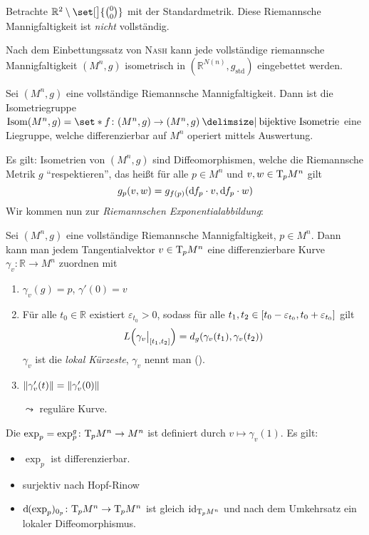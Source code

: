 \begin{beispiel*}
	Betrachte $\mathbb{R}^2 \setminus \set[\big]{\binom{0}{0}}$ mit der Standardmetrik. 
	Diese Riemannsche Mannigfaltigkeit ist \emph{nicht} vollständig.
\end{beispiel*}

\begin{bemerkung*}
	Nach dem Einbettungssatz von \textsc{Nash} kann jede vollständige riemannsche Mannigfaltigkeit $(M^n,g)$ isometrisch in $(\mathbb{R}^{N(n)},g_{\mathrm{std}})$ eingebettet werden.
\end{bemerkung*}

\begin{satz}[{name={Myers-Steenrod}}]
	Sei $(M^n,g)$ eine vollständige Riemannsche Mannigfaltigkeit.
	Dann ist die Isometriegruppe $\Isom(M^n,g) = \set*{f \colon (M^n,g) \to (M^n,g) \given \text{bijektive Isometrie} }$ eine Liegruppe, welche differenzierbar auf $M^n$ operiert mittels Auswertung.
\end{satz}

Es gilt: Isometrien von $(M^n,g)$ sind Diffeomorphismen, welche die Riemannsche Metrik $g$ \enquote{respektieren}, das heißt für alle $p \in M^n$ und $v,w \in \Tmap_p M^n$ gilt
\[
	g_p(v,w) = g_{f(p)} \enbrace*{\mathd f_p \cdot v , \mathd f_p \cdot w}
\]
Wir kommen nun zur \emph{Riemannschen Exponentialabbildung}: 

Sei $(M^n,g)$ eine vollständige Riemannsche Mannigfaltigkeit, $p \in M^n$.
Dann kann man jedem Tangentialvektor $v \in \Tmap_p M^n$ eine differenzierbare Kurve $\gamma_v \colon \mathbb{R} \to M^n$ zuordnen mit
\begin{enumerate}[1)]
	\item $\gamma_v(g)=p$, $\gamma'(0)=v$
	\item Für alle $t_0 \in \mathbb{R}$ existiert $\varepsilon_{t_0} >0$, sodass für alle $t_1,t_2 \in \benbrace*{t_0 - \varepsilon_{t_0}, t_0 + \varepsilon_{t_0}}$ gilt
	\[
		L \enbrace*{\gamma_v\big|_{\benbrace*{t_1,t_2}}} = d_g \enbrace*{\gamma_v(t_1), \gamma_v(t_2)}
	\]
	$\gamma_v$ ist die \emph{lokal Kürzeste}, $\gamma_v$ nennt man  ().
	\item $\norm*{\gamma_v'(t)} = \norm*{\gamma_v'(0)}$
	
	$\leadsto$ reguläre Kurve.
\end{enumerate}
Die  $\exp_p = \exp_p^g \colon \Tmap_p M^n \to M^n$ ist definiert durch $v \mapsto \gamma_v(1)$.
Es gilt:
\begin{itemize}
	\item $\exp_p$ ist differenzierbar.
	\item surjektiv nach Hopf-Rinow
	\item $\mathd(\exp_p)_{0_p} \colon \Tmap_p M^n \to \Tmap_p M^n$ ist gleich $\id_{\Tmap_p M^n}$ und nach dem Umkehrsatz ein lokaler Diffeomorphismus.
\end{itemize} 


